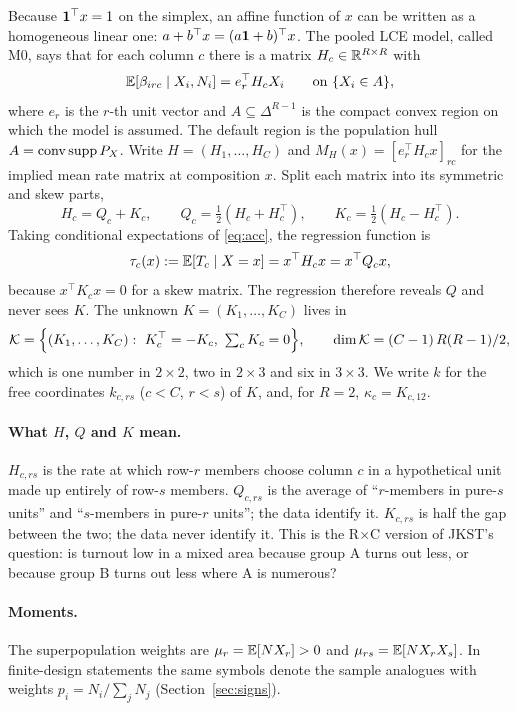Because $\mathbf 1^\top x=1$ on the simplex, an affine function of $x$ can be written
as a homogeneous linear one: $a+b^\top x=(a\mathbf 1+b)^\top x$. The pooled LCE model,
called M0, says that for each column $c$ there is a matrix $H_c\in\mathbb R^{R\times R}$
with
\begin{equation}\label{eq:lce}
\mathbb E[\beta_{irc}\mid X_i,N_i]=e_r^\top H_cX_i\qquad\text{on }\{X_i\in A\},
\end{equation}
where $e_r$ is the $r$-th unit vector and $A\subseteq\Delta^{R-1}$ is the compact
convex region on which the model is assumed. The default region is the
population hull $A=\operatorname{conv}\operatorname{supp} P_X$. Write $H=(H_1,\dots,H_C)$ and
$M_H(x)=[e_r^\top H_cx]_{rc}$ for the implied mean rate matrix at composition
$x$. Split each matrix into its symmetric and skew parts,
\[
H_c=Q_c+K_c,\qquad Q_c=\tfrac12(H_c+H_c^\top),\qquad K_c=\tfrac12(H_c-H_c^\top).
\]
Taking conditional expectations of \eqref{eq:acc}, the regression function is
\[
\tau_c(x):=\mathbb E[T_c\mid X=x]=x^\top H_cx=x^\top Q_cx ,
\]
because $x^\top K_cx=0$ for a skew matrix. The regression therefore reveals $Q$
and never sees $K$. The unknown $K=(K_1,\dots,K_C)$ lives in
\[
\Kspace=\Big\{(K_1,\dots,K_C):\ K_c^\top=-K_c,\ \textstyle\sum_cK_c=0\Big\},
\qquad\dim\Kspace=(C-1)\,R(R-1)/2 ,
\]
which is one number in $2\times2$, two in $2\times3$ and six in $3\times3$. We
write $k$ for the free coordinates $k_{c,rs}$ ($c<C$, $r<s$) of $K$, and, for
$R=2$, $\kappa_c=K_{c,12}$.

\paragraph{What $H$, $Q$ and $K$ mean.} $H_{c,rs}$ is the rate at which row-$r$
members choose column $c$ in a hypothetical unit made up entirely of row-$s$
members. $Q_{c,rs}$ is the average of ``$r$-members in pure-$s$ units'' and
``$s$-members in pure-$r$ units''; the data identify it. $K_{c,rs}$ is half the
gap between the two; the data never identify it. This is the R$\times$C version
of JKST's question: is turnout low in a mixed area because group A turns out
less, or because group B turns out less where A is numerous?

\paragraph{Moments.} The superpopulation weights are $\mu_r=\mathbb E[NX_r]>0$ and
$\mu_{rs}=\mathbb E[NX_rX_s]$. In finite-design statements the same symbols denote the
sample analogues with weights $p_i=N_i/\sum_jN_j$ (Section~\ref{sec:signs}).

